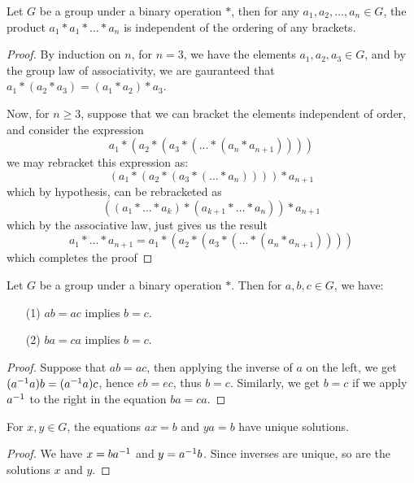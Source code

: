 \begin{theorem}\label{1.2.2}
  Let $G$ be a group under a binary operation  $\ast$, then for any  $a_1,
  a_2, \dots, a_n \in G$, the product $a_1 \ast a_1 \ast \dots \ast a_n$ is
  independent of the ordering of any brackets.
\end{theorem}
\begin{proof}
  By induction on $n$, for $n=3$, we have the elements $a_1,a_2,a_3
  \in G$, and by the group law of associativity, we are gauranteed
  that $a_1 \ast (a_2 \ast a_3)=(a_1 \ast a_2) \ast a_3$.

  Now, for $n \geq 3$, suppose that we can bracket the elements
  independent of order, and consider the expression
  \begin{equation*}
    a_1 \ast (a_2 \ast (a_3 \ast ( \dots \ast (a_n \ast a_{n+1}))))
  \end{equation*}
  we may rebracket this expression as:
  \begin{equation*}
    (a_1 \ast (a_2 \ast (a_3 \ast ( \dots \ast a_n)))) \ast a_{n+1}
  \end{equation*}
  which by hypothesis, can be rebracketed as
  \begin{equation*}
    ((a_1 \ast \dots \ast a_k) \ast (a_{k+1} \ast \dots \ast a_n)) \ast a_{n+1}
  \end{equation*}
  which by the associative law, just gives us the result
  \begin{equation*}
    a_1 \ast \dots \ast a_{n+1}=a_1 \ast (a_2 \ast (a_3 \ast ( \dots \ast (a_n \ast a_{n+1}))))
  \end{equation*}
  which completes the proof
\end{proof}

\begin{theorem}\label{1.2.3}
  Let $G$ be a group under a binary operation  $\ast$. Then for  $a,b,c \in
  G$, we have:
  \begin{enumerate}
    \item[(1)] $ab=ac$ implies  $b=c$.

    \item[(2)] $ba=ca$ implies  $b=c$.
  \end{enumerate}
\end{theorem}
\begin{proof}
  Suppose that $ab=ac$, then applying the inverse of $a$ on the left, we get
  $(a^{-1}a)b=(a^{-1}a)c$, hence $eb=ec$, thus  $b=c$. Similarly, we get
  $b=c$ if we apply  $a^{-1}$ to the right in the equation $ba=ca$.
\end{proof}
\begin{corollary}
  For $x,y \in G$, the equations  $ax=b$ and  $ya=b$ have unique solutions.
\end{corollary}
\begin{proof}
  We have $x=ba^{-1}$ and $y=a^{-1}b$. Since inverses are unique, so are the
  solutions $x$ and $y$.
\end{proof}

